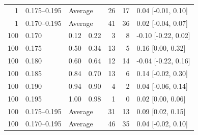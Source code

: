 \begin{center}
\begin{minipage}{\linewidth}
\begin{tabular}{rlrrrrl}
1 & 0.175--0.195 & \multicolumn{2}{l}{Average} & 26 & 17 & 0.04 [-0.01, 0.10] \\
1 & 0.170--0.195 & \multicolumn{2}{l}{Average} & 41 & 36 & 0.02 [-0.04, 0.07] \\
\midrule
100 & 0.170 & 0.12 & 0.22 & 3 & 8 & -0.10 [-0.22, 0.02] \\
100 & 0.175 & 0.50 & 0.34 & 13 & 5 & 0.16 [0.00, 0.32] \\
100 & 0.180 & 0.60 & 0.64 & 12 & 14 & -0.04 [-0.22, 0.16] \\
100 & 0.185 & 0.84 & 0.70 & 13 & 6 & 0.14 [-0.02, 0.30] \\
100 & 0.190 & 0.94 & 0.90 & 4 & 2 & 0.04 [-0.06, 0.14] \\
100 & 0.195 & 1.00 & 0.98 & 1 & 0 & 0.02 [0.00, 0.06] \\
100 & 0.175--0.195 & \multicolumn{2}{l}{Average} & 31 & 13 & 0.09 [0.02, 0.15] \\
100 & 0.170--0.195 & \multicolumn{2}{l}{Average} & 46 & 35 & 0.04 [-0.02, 0.10] \\
\bottomrule
\end{tabular}
\end{minipage}
\end{center}




